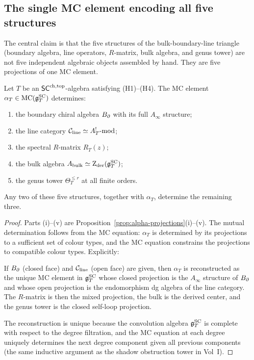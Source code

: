 \subsection{The single MC element encoding all five structures}

The central claim is that the five structures of the
bulk-boundary-line triangle (boundary algebra, line operators,
$R$-matrix, bulk algebra, and genus tower) are not five independent
algebraic objects assembled by hand. They are five projections of
one MC element.

\begin{theorem}
Let $T$ be an $\mathsf{SC}^{\mathrm{ch,top}}$-algebra satisfying \textup{(H1)--(H4)}.
The MC element $\alpha_T\in\operatorname{MC}(\mathfrak{g}^{\mathrm{SC}}_T)$ determines:
\begin{enumerate}[label=\textup{(\roman*)}]
\item the boundary chiral algebra $B_{\partial}$ with its full
$A_\infty$ structure;
\item the line category $\mathcal C_{\mathrm{line}}\simeq A^!_T\text{-mod}$;
\item the spectral $R$-matrix $R_T(z)$;
\item the bulk algebra $A_{\mathrm{bulk}}\simeq\operatorname{Z}_{\mathrm{der}}(\mathfrak{g}^{\mathrm{SC}}_T)$;
\item the genus tower $\Theta_T^{\le r}$ at all finite orders.
\end{enumerate}
Any two of these five structures, together with
$\alpha_T$, determine the remaining three.
\end{theorem}

\begin{proof}
Parts (i)--(v) are Proposition~\ref{prop:alpha-projections}(i)--(v).
The mutual determination follows from the MC equation: $\alpha_T$
is determined by its projections to a sufficient set of colour
types, and the MC equation constrains the projections to
compatible colour types. Explicitly:

If $B_{\partial}$ (closed face) and $\mathcal C_{\mathrm{line}}$ (open face)
are given, then $\alpha_T$ is reconstructed as the unique MC
element in $\mathfrak{g}^{\mathrm{SC}}_T$ whose closed projection is the $A_\infty$
structure of $B_{\partial}$ and whose open projection is the
endomorphism dg algebra of the line category. The $R$-matrix is
then the mixed projection, the bulk is the derived center, and
the genus tower is the closed self-loop projection.

The reconstruction is unique because the convolution algebra
$\mathfrak{g}^{\mathrm{SC}}_T$ is complete with respect to the degree filtration, and the
MC equation at each degree uniquely determines the next degree
component given all previous components (the same inductive argument
as the shadow obstruction tower in Vol~I).
\end{proof}


